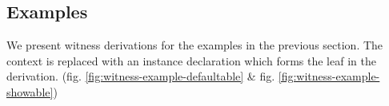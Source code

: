 





\subsection{Examples}

We present witness derivations for the examples in the previous section.
The context is replaced with an instance declaration which forms the leaf in the derivation. (fig. \ref{fig:witness-example-defaultable} \& fig. \ref{fig:witness-example-showable})

